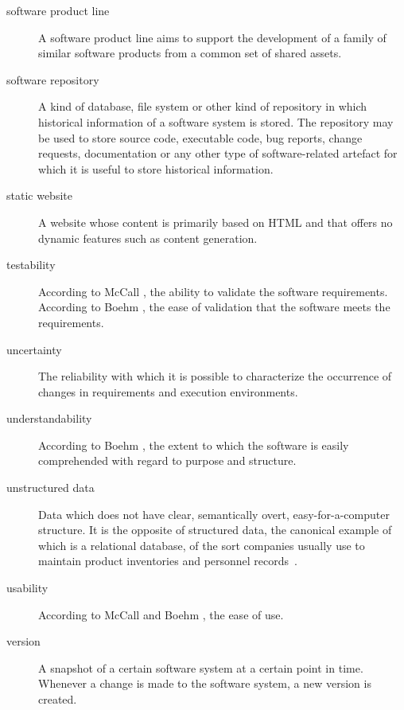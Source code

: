 \documentclass[11pt, oneside]{article}
\begin{document}
\begin{description}
\item[software product line]
A software product line aims to support the development of a family of similar software products from a common set of shared assets.

\item[software repository]
A kind of database, file system or other kind of repository in which historical information of a software system is stored. The repository may be used to store source code, executable code, bug reports, change requests, documentation or any other type of  software-related artefact for which it is useful to store historical information.

\item[static website]
A website whose content is primarily based on HTML and that offers no dynamic features such as content generation.


\item[testability]
According to McCall \cite{mccall1977factors}, the ability to validate the software requirements.
According to Boehm \cite{opac-b1104886}, the ease of validation that the software meets the requirements.



\item[uncertainty]
The reliability with which it is possible to characterize the occurrence of changes in requirements and execution environments.

\item[understandability]
According to Boehm \cite{opac-b1104886}, the extent to which the software is easily comprehended with regard to purpose and structure.

\item[unstructured data]
Data which does not have clear, semantically overt, easy-for-a-computer structure. It is the opposite of structured data, the canonical example of which is a relational database, of the sort companies usually use to maintain product inventories and personnel records~\cite{manning_introduction_2008}.

\item[usability]
According to McCall \cite{mccall1977factors} and Boehm \cite{opac-b1104886}, the ease of use.


\item[version]
A snapshot of a certain software system at a certain point in time. Whenever a change is made to the software system, a new version is created.


\end{description}
\end{document}
